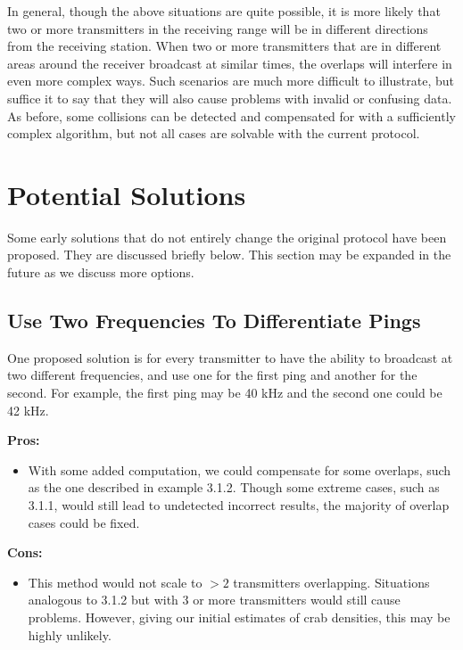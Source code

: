 \documentclass[12pt]{article}
\begin{document}
In general, though the above situations are quite possible, it is more likely
that two or more transmitters in the receiving range will be in different
directions from the receiving station.
When two or more transmitters that are in different areas around the receiver
broadcast at similar times, the overlaps will interfere in even more complex
ways.
Such scenarios are much more difficult to illustrate, but suffice it to say
that they will also cause problems with invalid or confusing data.
As before, some collisions can be detected and compensated for with a
sufficiently complex algorithm, but not all cases are solvable with the current
protocol.

\section{Potential Solutions}

Some early solutions that do not entirely change the original protocol have
been proposed. They are discussed briefly below. This section may be expanded
in the future as we discuss more options.

\subsection{Use Two Frequencies To Differentiate Pings}

One proposed solution is for every transmitter to have the ability to broadcast
at two different frequencies, and use one for the first ping and another for
the second. For example, the first ping may be 40 kHz and the second one could
be 42 kHz.

{\bf Pros:}
\begin{itemize}
	\item With some added computation, we could compensate for some overlaps,
	such as the one described in example 3.1.2.
	Though some extreme cases, such as 3.1.1, would still lead to undetected
	incorrect results, the majority of overlap cases could be fixed.
\end{itemize}

{\bf Cons:}
\begin{itemize}
	\item This method would not scale to $>2$ transmitters overlapping. 
		Situations analogous to 3.1.2 but with 3 or more transmitters would
		still cause problems.
		However, giving our initial estimates of crab densities, this may be
		highly unlikely.
\end{itemize}
\end{document}
